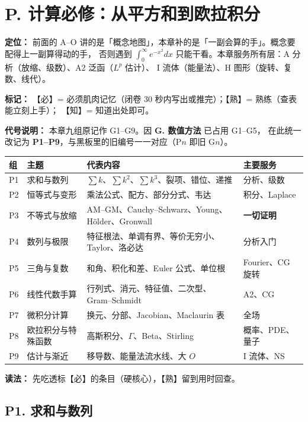 \section{P. 计算必修：从平方和到欧拉积分}
\label{sec:computation}

\textbf{定位：} 前面的 A--O 讲的是「概念地图」，本章补的是「一副会算的手」。概念要配得上一副算得动的手，
否则遇到 $\int_0^\infty e^{-x^2}dx$ 只能干看。本章服务所有层：A 分析（放缩、级数）、A2 泛函（$L^p$ 估计）、
I 流体（能量法）、H 图形（旋转、复数、线代）。

\textbf{标记：} 【必】= 必须肌肉记忆（闭卷 30 秒内写出或推完）；【熟】= 熟练（查表能立刻上手）；
【知】= 知道出处即可。

\textbf{代号说明：} 本章九组原记作 G1--G9。因 \textbf{G. 数值方法} 已占用 G1--G5，
在此统一改记为 \textbf{P1--P9}，与黑板里的旧编号一一对应（P$n$ 即旧 G$n$）。

\begin{center}
\begin{tabular}{L{0.9cm}L{3.7cm}L{5.9cm}L{3.5cm}}
\toprule
\textbf{组} & \textbf{主题} & \textbf{代表内容} & \textbf{主要服务} \\
\midrule
P1 & 求和与数列 & $\sum k$、$\sum k^2$、$\sum k^3$、裂项、错位、递推 & 分析、级数 \\
P2 & 恒等式与变形 & 乘法公式、配方、部分分式、韦达 & 积分、Laplace \\
P3 & 不等式与放缩 & AM--GM、Cauchy--Schwarz、Young、Hölder、Gronwall & \textbf{一切证明} \\
P4 & 数列与极限 & 特征根法、单调有界、等价无穷小、Taylor、洛必达 & 分析入门 \\
P5 & 三角与复数 & 和角、积化和差、Euler 公式、单位根 & Fourier、CG 旋转 \\
P6 & 线性代数手算 & 行列式、消元、特征值、二次型、Gram--Schmidt & A2、CG \\
P7 & 微积分计算 & 换元、分部、Jacobian、Maclaurin 表 & 全场 \\
P8 & 欧拉积分与特殊函数 & 高斯积分、$\Gamma$、Beta、Stirling & 概率、PDE、量子 \\
P9 & 估计与渐近 & 移导数、能量法流水线、大 $O$ & I 流体、NS \\
\bottomrule
\end{tabular}
\end{center}

\textbf{读法：} 先吃透标【必】的条目（硬核心），【熟】留到用时回查。

\subsection{P1. 求和与数列}


